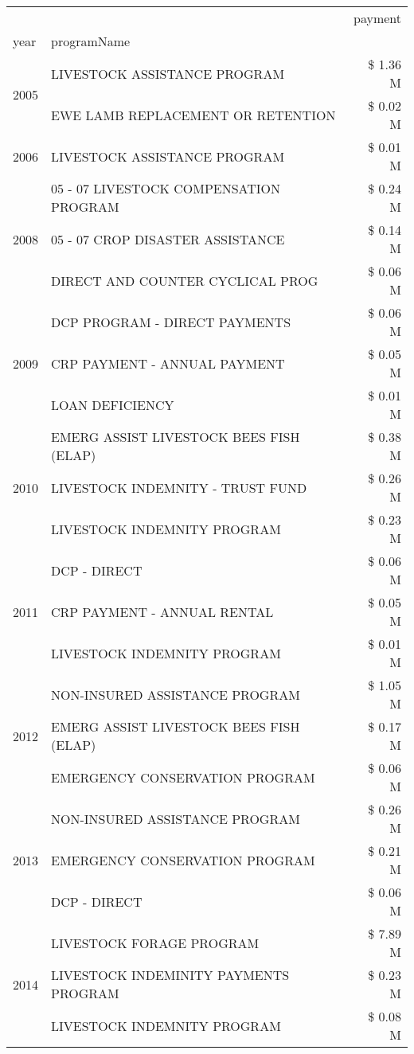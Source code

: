 \begin{tabular}{llr}
\toprule
 &  & payment \\
year & programName &  \\
\midrule
\multirow[t]{2}{*}{2005} & LIVESTOCK ASSISTANCE PROGRAM & \$ 1.36 M \\
 & EWE LAMB REPLACEMENT OR RETENTION & \$ 0.02 M \\
\cline{1-3}
2006 & LIVESTOCK ASSISTANCE PROGRAM & \$ 0.01 M \\
\cline{1-3}
\multirow[t]{3}{*}{2008} & 05 - 07 LIVESTOCK COMPENSATION PROGRAM & \$ 0.24 M \\
 & 05 - 07 CROP DISASTER ASSISTANCE & \$ 0.14 M \\
 & DIRECT AND COUNTER CYCLICAL PROG & \$ 0.06 M \\
\cline{1-3}
\multirow[t]{3}{*}{2009} & DCP PROGRAM - DIRECT PAYMENTS & \$ 0.06 M \\
 & CRP PAYMENT - ANNUAL PAYMENT & \$ 0.05 M \\
 & LOAN DEFICIENCY & \$ 0.01 M \\
\cline{1-3}
\multirow[t]{3}{*}{2010} & EMERG ASSIST LIVESTOCK BEES FISH (ELAP) & \$ 0.38 M \\
 & LIVESTOCK INDEMNITY - TRUST FUND & \$ 0.26 M \\
 & LIVESTOCK INDEMNITY PROGRAM & \$ 0.23 M \\
\cline{1-3}
\multirow[t]{3}{*}{2011} & DCP - DIRECT & \$ 0.06 M \\
 & CRP PAYMENT - ANNUAL RENTAL & \$ 0.05 M \\
 & LIVESTOCK INDEMNITY PROGRAM & \$ 0.01 M \\
\cline{1-3}
\multirow[t]{3}{*}{2012} & NON-INSURED ASSISTANCE PROGRAM & \$ 1.05 M \\
 & EMERG ASSIST LIVESTOCK BEES FISH (ELAP) & \$ 0.17 M \\
 & EMERGENCY CONSERVATION PROGRAM & \$ 0.06 M \\
\cline{1-3}
\multirow[t]{3}{*}{2013} & NON-INSURED ASSISTANCE PROGRAM & \$ 0.26 M \\
 & EMERGENCY CONSERVATION PROGRAM & \$ 0.21 M \\
 & DCP - DIRECT & \$ 0.06 M \\
\cline{1-3}
\multirow[t]{3}{*}{2014} & LIVESTOCK FORAGE PROGRAM & \$ 7.89 M \\
 & LIVESTOCK INDEMINITY PAYMENTS PROGRAM & \$ 0.23 M \\
 & LIVESTOCK INDEMNITY PROGRAM & \$ 0.08 M \\
\cline{1-3}

\end{tabular}
